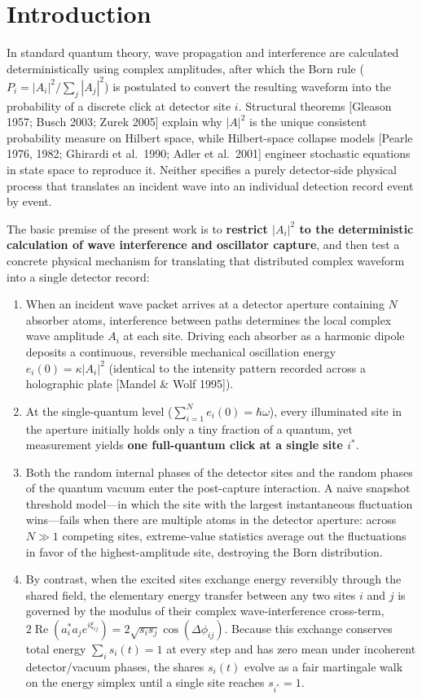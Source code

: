 \documentclass[11pt,a4paper]{article}
\begin{document}
\section{Introduction}

In standard quantum theory, wave propagation and interference are calculated deterministically using complex amplitudes, after which the Born rule ($P_i = |A_i|^2 / \sum_j |A_j|^2$) is postulated to convert the resulting waveform into the probability of a discrete click at detector site $i$. Structural theorems [Gleason 1957; Busch 2003; Zurek 2005] explain why $|A|^2$ is the unique consistent probability measure on Hilbert space, while Hilbert-space collapse models [Pearle 1976, 1982; Ghirardi et al.\ 1990; Adler et al.\ 2001] engineer stochastic equations in state space to reproduce it. Neither specifies a purely detector-side physical process that translates an incident wave into an individual detection record event by event.

The basic premise of the present work is to \textbf{restrict $|A_i|^2$ to the deterministic calculation of wave interference and oscillator capture}, and then test a concrete physical mechanism for translating that distributed complex waveform into a single detector record:
\begin{enumerate}[leftmargin=*]
    \item When an incident wave packet arrives at a detector aperture containing $N$ absorber atoms, interference between paths determines the local complex wave amplitude $A_i$ at each site. Driving each absorber as a harmonic dipole deposits a continuous, reversible mechanical oscillation energy $e_i(0) = \kappa |A_i|^2$ (identical to the intensity pattern recorded across a holographic plate [Mandel \& Wolf 1995]).
    \item At the single-quantum level ($\sum_{i=1}^N e_i(0) = \hbar\omega$), every illuminated site in the aperture initially holds only a tiny fraction of a quantum, yet measurement yields \textbf{one full-quantum click at a single site $i^*$}.
    \item Both the random internal phases of the detector sites and the random phases of the quantum vacuum enter the post-capture interaction. A naive snapshot threshold model---in which the site with the largest instantaneous fluctuation wins---fails when there are multiple atoms in the detector aperture: across $N \gg 1$ competing sites, extreme-value statistics average out the fluctuations in favor of the highest-amplitude site, destroying the Born distribution.
    \item By contrast, when the excited sites exchange energy reversibly through the shared field, the elementary energy transfer between any two sites $i$ and $j$ is governed by the modulus of their complex wave-interference cross-term, $2\operatorname{Re}(a_i^* a_j e^{i\xi_{ij}}) = 2\sqrt{s_i s_j}\cos(\Delta\phi_{ij})$. Because this exchange conserves total energy $\sum_i s_i(t) = 1$ at every step and has zero mean under incoherent detector/vacuum phases, the shares $s_i(t)$ evolve as a fair martingale walk on the energy simplex until a single site reaches $s_{i^*} = 1$.
\end{enumerate}
\end{document}

